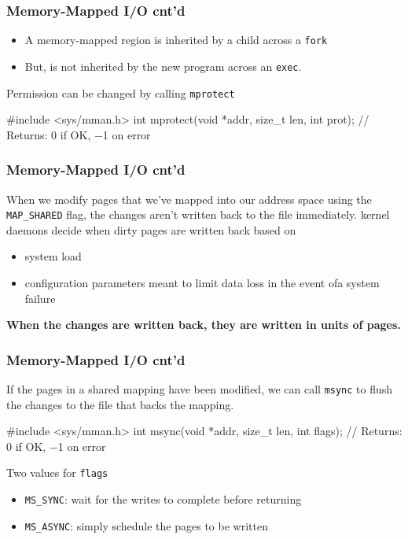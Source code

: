 \documentclass[newPxFont,sthlmFooter,nooffset]{beamer}
\begin{document}
\begin{frame}[t, fragile]
  \frametitle{Memory-Mapped I/O cnt'd}

  \begin{itemize}
  \item A memory-mapped region is inherited by a child across a \texttt{fork}
  \item But, is not inherited by the new program across an \texttt{exec}.
  \end{itemize}
\bigskip

Permission can be changed by calling \texttt{mprotect}
\begin{codedef}
#include <sys/mman.h>
int mprotect(void *addr, size_t len, int prot);
// Returns: 0 if OK, −1 on error
\end{codedef}

\end{frame}


\begin{frame}[t, fragile]
  \frametitle{Memory-Mapped I/O cnt'd}
When we modify pages that we’ve mapped into our address space using the \texttt{MAP\_SHARED} flag, the changes aren’t written back to the file immediately.
\bigskip
kernel daemons decide when dirty pages are written back based on
\begin{itemize}
\item system load
\item configuration parameters meant to limit data loss in the event ofa system failure
\end{itemize}
\textbf{When the changes are written back, they are written in units of pages. }

\end{frame}


\begin{frame}[t, fragile]
  \frametitle{Memory-Mapped I/O cnt'd}
If the pages in a shared mapping have been modified, we can call \texttt{msync} to flush the changes to the file that backs the mapping.
\begin{codedef}
#include <sys/mman.h>
int msync(void *addr, size_t len, int flags);
// Returns: 0 if OK, −1 on error
\end{codedef}

Two values for \texttt{flags}
\begin{itemize}
\item \texttt{MS\_SYNC}: wait for the writes to complete before returning
\item \texttt{MS\_ASYNC}: simply schedule the pages to be written
\end{itemize}

\end{frame}
\end{document}
